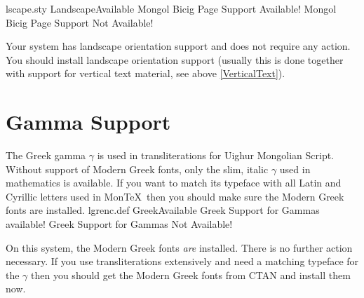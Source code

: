 \documentclass[11pt,a4paper]{article}
\begin{document}
	\PackageDiagnostics%
		{lscape.sty}				%
		{LandscapeAvailable}			%
		{Mongol Bicig Page Support Available!}	%
		{Mongol Bicig Page Support Not Available!}%

	\ifnum{}
		Your system has landscape orientation support and
		does not require any action.
	\else
		You should install landscape orientation support
		(usually this is done together with support for
		vertical text material, see above \ref{VerticalText}).
	\fi
\fi


\section{Gamma Support}

The Greek gamma $\gamma$ is used in transliterations for Uighur 
Mongolian Script. Without support of Modern Greek fonts, only
the slim, italic $\gamma$ used in mathematics is available.
If you want to match its typeface with all Latin and Cyrillic
letters used in Mon\TeX\ then you should make sure the Modern
Greek fonts are installed.
%
\PackageDiagnostics%
	{lgrenc.def}				%
	{GreekAvailable}			%
	{Greek Support for Gammas available!}%
	{Greek Support for Gammas Not Available!}%

\ifnum{}
	On this system, the Modern Greek fonts \textit{are} installed.
	There is no further action necessary.
\else
	If you use transliterations extensively and need a matching
	\marginpar{\huge!!!}
	typeface for the $\gamma$ then you should get the Modern
	Greek fonts from CTAN and install them now.
\fi
\end{document}
